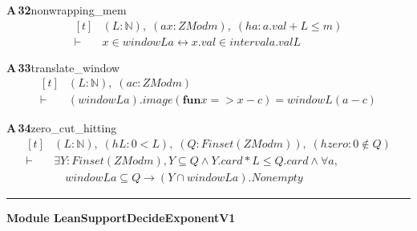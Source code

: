 \documentclass[conference]{IEEEtran}
\theoremstyle{definition}
\newcommand{\lean}[1]{\textsf{\footnotesize #1}}
\begin{document}
\noindent\textbf{A\,32}\quad\lean{nonwrapping\_mem}
{\footnotesize\[ \begin{aligned}[t]
&(\mathit{L} : \mathbb{N} ),\; (\mathit{a} \mathit{x} : \mathit{ZMod} \mathit{m}),\; (\mathit{ha} : \mathit{a}.\mathit{val}+\mathit{L} \leq \mathit{m})\\
\vdash\;&\mathit{x} \in \mathit{window} \mathit{L} \mathit{a} \leftrightarrow \mathit{x}.\mathit{val} \in \mathit{interval} \mathit{a}.\mathit{val} \mathit{L}
\end{aligned} \]}

\noindent\textbf{A\,33}\quad\lean{translate\_window}
{\footnotesize\[ \begin{aligned}[t]
&(\mathit{L} : \mathbb{N} ),\; (\mathit{a} \mathit{c} : \mathit{ZMod} \mathit{m})\\
\vdash\;&(\mathit{window} \mathit{L} \mathit{a}).\mathit{image} (\mathbf{fun} \mathit{x} => \mathit{x}-\mathit{c})=\mathit{window} \mathit{L} (\mathit{a}-\mathit{c})
\end{aligned} \]}

\noindent\textbf{A\,34}\quad\lean{zero\_cut\_hitting}
{\footnotesize\[ \begin{aligned}[t]
&(\mathit{L} : \mathbb{N} ),\; (\mathit{hL} : 0<\mathit{L}),\; (\mathit{Q} : \mathit{Finset} (\mathit{ZMod} \mathit{m})),\; (\mathit{hzero} : 0 \notin \mathit{Q})\\
\vdash\;&\exists \mathit{Y} : \mathit{Finset} (\mathit{ZMod} \mathit{m}),\mathit{Y} \subseteq \mathit{Q} \wedge \mathit{Y}.\mathit{card}*\mathit{L} \leq \mathit{Q}.\mathit{card} \wedge \forall \mathit{a},\\
&\quad \mathit{window} \mathit{L} \mathit{a} \subseteq \mathit{Q} \to (\mathit{Y} \cap \mathit{window} \mathit{L} \mathit{a}).\mathit{Nonempty}
\end{aligned} \]}

\vspace{4pt}\noindent\rule{\columnwidth}{0.4pt}\par\vspace{2pt}
\noindent\textbf{Module \lean{LeanSupportDecideExponentV1}}\par\vspace{3pt}
\end{document}
